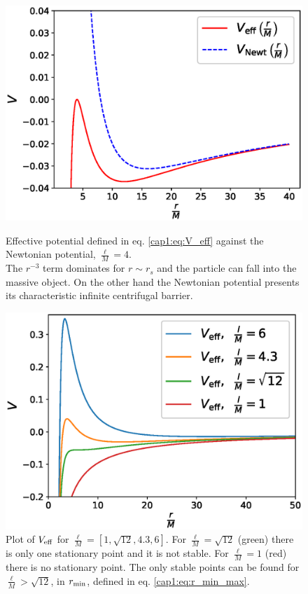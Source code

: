 \begin{figure}[h]
\begin{minipage}{0.49 \textwidth}
    \centering
    \includegraphics[width = \textwidth]{Figures/V_eff.eps}
    \caption{Effective potential defined in eq. \ref{cap1:eq:V_eff} against the
    Newtonian potential, $\frac{\ell}{M} = 4$. \\
    The $r^{-3}$ term dominates for $r \sim r_s$ and the
    particle can fall into the massive object.
    On the other hand the Newtonian potential presents its characteristic
    infinite centrifugal barrier.}
    \label{cap1:fig:V_effvsVN}
\end{minipage}
\hspace{0.009 \textwidth}
\begin{minipage}{0.49 \textwidth}
    \centering
    \includegraphics[width = \textwidth]{Figures/V_eff_tanti.eps}
    \caption{Plot of $V_{\rm eff}$ for
    $\frac{\ell}{M} = [1, \sqrt{12}, 4.3, 6]$.
    For $\frac{\ell}{M} = \sqrt{12}$ (green) there is only one stationary point
    and it is not stable.
    For $\frac{\ell}{M} = 1$ (red) there is no stationary point.
    The only stable points can be found for $\frac{\ell}{M} > \sqrt{12}$,
    in $r_{\rm min}$, defined in eq. \ref{cap1:eq:r_min_max}.}
    \label{cap1:fig:V_eff_tanti}
\end{minipage}
\end{figure}

